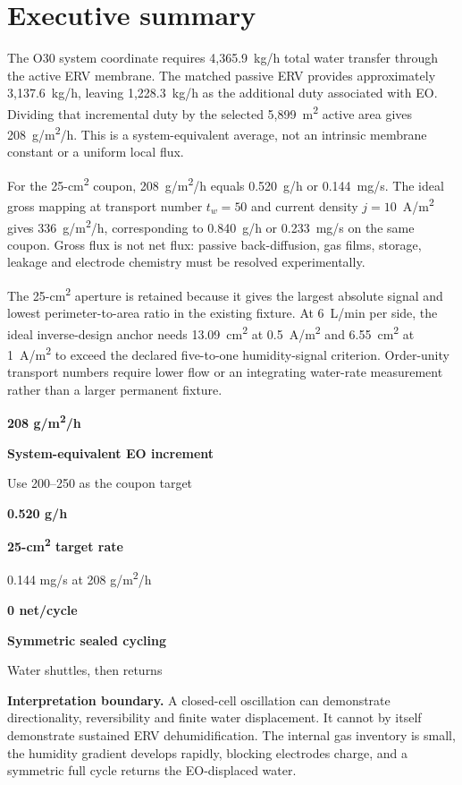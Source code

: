\documentclass[10pt,a4paper]{article}
\newcommand{\sans}{\fontfamily{qhv}\selectfont}
\newcommand{\metric}[3]{\begin{minipage}[t]{0.30\textwidth}{\sans\bfseries\fontsize{18}{20}\selectfont\color{Navy}#1}\par{\sans\bfseries\small #2}\par{\scriptsize\color{Slate}#3}\end{minipage}}
\begin{document}
\clearpage
\section*{Executive summary}

The O30 system coordinate requires 4,365.9~kg/h total water transfer through
the active ERV membrane. The matched passive ERV provides approximately
3,137.6~kg/h, leaving 1,228.3~kg/h as the additional duty associated with EO.
Dividing that incremental duty by the selected 5,899~m\textsuperscript{2}
active area gives 208~g/m\textsuperscript{2}/h. This is a system-equivalent
average, not an intrinsic membrane constant or a uniform local flux.

For the 25-cm\textsuperscript{2} coupon, 208~g/m\textsuperscript{2}/h equals
0.520~g/h or 0.144~mg/s. The ideal gross mapping at transport number
$t_w=50$ and current density $j=10$~A/m\textsuperscript{2} gives
336~g/m\textsuperscript{2}/h, corresponding to 0.840~g/h or 0.233~mg/s on
the same coupon. Gross flux is not net flux: passive back-diffusion, gas films,
storage, leakage and electrode chemistry must be resolved experimentally.

The 25-cm\textsuperscript{2} aperture is retained because it gives the largest
absolute signal and lowest perimeter-to-area ratio in the existing fixture.
At 6~L/min per side, the ideal inverse-design anchor needs 13.09~cm\textsuperscript{2}
at 0.5~A/m\textsuperscript{2} and 6.55~cm\textsuperscript{2} at
1~A/m\textsuperscript{2} to exceed the declared five-to-one humidity-signal
criterion. Order-unity transport numbers require lower flow or an integrating
water-rate measurement rather than a larger permanent fixture.

\begin{center}
\metric{208 g/m\textsuperscript{2}/h}{System-equivalent EO increment}{Use 200--250 as the coupon target}\hfill
\metric{0.520 g/h}{25-cm\textsuperscript{2} target rate}{0.144 mg/s at 208 g/m\textsuperscript{2}/h}\hfill
\metric{0 net/cycle}{Symmetric sealed cycling}{Water shuttles, then returns}
\end{center}

\begin{warningbox}
\textbf{Interpretation boundary.} A closed-cell oscillation can demonstrate
directionality, reversibility and finite water displacement. It cannot by
itself demonstrate sustained ERV dehumidification. The internal gas inventory
is small, the humidity gradient develops rapidly, blocking electrodes charge,
and a symmetric full cycle returns the EO-displaced water.
\end{warningbox}
\end{document}
